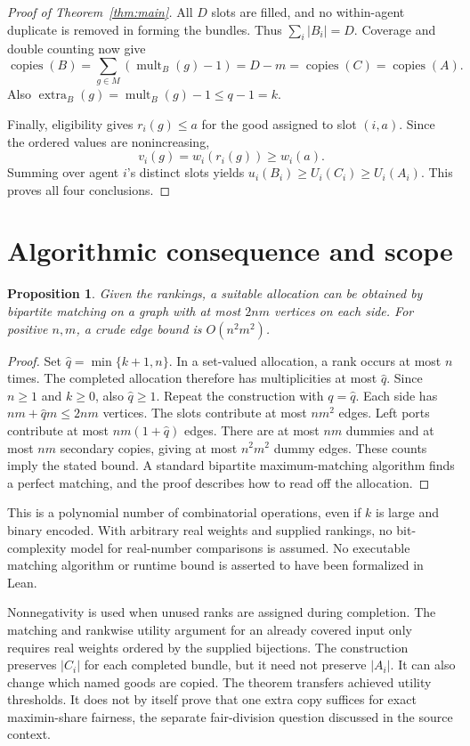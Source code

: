 \documentclass[11pt,a4paper]{article}
\newtheorem{proposition}[theorem]{Proposition}
\newcommand{\mult}{\operatorname{mult}}
\newcommand{\extra}{\operatorname{extra}}
\newcommand{\copies}{\operatorname{copies}}
\begin{document}
\begin{proof}[Proof of Theorem~\ref{thm:main}]
All $D$ slots are filled, and no within-agent duplicate is removed in
forming the bundles. Thus $\sum_i|B_i|=D$. Coverage and double counting now
give
\[
 \copies(B)=\sum_{g\in M}(\mult_B(g)-1)=D-m
 =\copies(C)=\copies(A).
\]
Also $\extra_B(g)=\mult_B(g)-1\le q-1=k$.

Finally, eligibility gives $r_i(g)\le a$ for the good assigned to slot
$(i,a)$. Since the ordered values are nonincreasing,
\[
 v_i(g)=w_i(r_i(g))\ge w_i(a).
\]
Summing over agent $i$'s distinct slots yields
$u_i(B_i)\ge U_i(C_i)\ge U_i(A_i)$. This proves all four conclusions.
\end{proof}

\section{Algorithmic consequence and scope}\label{sec:scope}
\begin{proposition}\label{prop:algorithm}
Given the rankings, a suitable allocation can be obtained by bipartite
matching on a graph with at most $2nm$ vertices on each side. For positive
$n,m$, a crude edge bound is $O(n^2m^2)$.
\end{proposition}
\begin{proof}
Set $\widehat q=\min\{k+1,n\}$. In a set-valued allocation, a rank occurs
at most $n$ times. The completed allocation therefore has multiplicities
at most $\widehat q$. Since $n\ge1$ and $k\ge0$, also $\widehat q\ge1$.
Repeat the construction with $q=\widehat q$.
Each side has $nm+\widehat q m\le2nm$ vertices. The slots contribute at
most $nm^2$ edges. Left ports contribute at most $nm(1+\widehat q)$ edges.
There are at most $nm$ dummies and at most $nm$ secondary copies, giving
at most $n^2m^2$ dummy edges. These counts imply the stated bound.
A standard bipartite maximum-matching algorithm finds a perfect matching,
and the proof describes how to read off the allocation.
\end{proof}

This is a polynomial number of combinatorial operations, even if $k$ is
large and binary encoded. With arbitrary real weights and supplied
rankings, no bit-complexity model for real-number comparisons is assumed.
No executable matching algorithm or runtime bound is asserted to have been
formalized in Lean.

Nonnegativity is used when unused ranks are assigned during completion.
The matching and rankwise utility argument for an already covered input
only requires real weights ordered by the supplied bijections.
The construction preserves $|C_i|$ for each completed bundle, but it need
not preserve $|A_i|$. It can also change which named goods are copied.
The theorem transfers achieved utility thresholds. It does not by itself
prove that one extra copy suffices for exact maximin-share fairness, the
separate fair-division question discussed in the source context.
\end{document}
